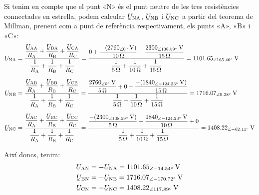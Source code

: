 \begin{exemple}
    Si tenim en compte que el punt «N» és el punt neutre de les tres resistències connectades en estrella, podem calcular $\cmplx{U}\ped{NA} $, $\cmplx{U}\ped{NB} $ i $\cmplx{U}\ped{NC}$ a partir del teorema de Millman, prenent com a punt de referència respectivament, els punts «A»,  «B»  i «C»:
    \begin{align*}
          \cmplx{U}\ped{NA} &= \frac{\dfrac{\cmplx{U}\ped{AA}}{R\ped{A}} + \dfrac{\cmplx{U}\ped{BA}}{R\ped{B}} + \dfrac{\cmplx{U}\ped{CA}}{R\ped{C}}}{\dfrac{1}{R\ped{A}} + \dfrac{1}{R\ped{B}} + \dfrac{1}{R\ped{C}}} = \frac{0 + \dfrac{-(\SIpd{2760}{0}{V})}{\SI{10}{\ohm}} + \dfrac{\SIpd{2300}{138,59}{V}}{\SI{15}{\ohm}}}{\dfrac{1}{\SI{5}{\ohm}} + \dfrac{1}{\SI{10}{\ohm}} + \dfrac{1}{\SI{15}{\ohm}}} = \SIpd{1101,65}{165,46}{V} \\[1.5ex]
          \cmplx{U}\ped{NB} &= \frac{\dfrac{\cmplx{U}\ped{AB}}{R\ped{A}} + \dfrac{\cmplx{U}\ped{BB}}{R\ped{B}} + \dfrac{\cmplx{U}\ped{CB}}{R\ped{C}}}{\dfrac{1}{R\ped{A}} + \dfrac{1}{R\ped{B}} + \dfrac{1}{R\ped{C}}} = \frac{\dfrac{\SIpd{2760}{0}{V}}{\SI{5}{\ohm}} + 0 + \dfrac{-(\SIpd{1840}{-124,23}{V})}{\SI{15}{\ohm}}}{\dfrac{1}{\SI{5}{\ohm}} + \dfrac{1}{\SI{10}{\ohm}} + \dfrac{1}{\SI{15}{\ohm}}} = \SIpd{1716,07}{9,28}{V} \\[1.5ex]
          \cmplx{U}\ped{NC} &= \frac{\dfrac{\cmplx{U}\ped{AC}}{R\ped{A}} + \dfrac{\cmplx{U}\ped{BC}}{R\ped{B}} + \dfrac{\cmplx{U}\ped{CC}}{R\ped{C}}}{\dfrac{1}{R\ped{A}} + \dfrac{1}{R\ped{B}} + \dfrac{1}{R\ped{C}}} = \frac{\dfrac{-(\SIpd{2300}{138,59}{V})}{\SI{5}{\ohm}} + \dfrac{\SIpd{1840}{-124,23}{V}}{\SI{10}{\ohm}} + 0}{\dfrac{1}{\SI{5}{\ohm}} + \dfrac{1}{\SI{10}{\ohm}} + \dfrac{1}{\SI{15}{\ohm}}} = \SIpd{1408,22}{-62.11}{V}
    \end{align*}

    Així doncs, tenim:
    \begin{align*}
        \cmplx{U}\ped{AN} &= -\cmplx{U}\ped{NA} =  \SIpd{1101,65}{-14,54}{V} \\
        \cmplx{U}\ped{BN} &= -\cmplx{U}\ped{NB} =  \SIpd{1716,07}{-170,72}{V} \\
        \cmplx{U}\ped{CN} &= -\cmplx{U}\ped{NC} =  \SIpd{1408,22}{117,89}{V}
    \end{align*}


\end{exemple}
